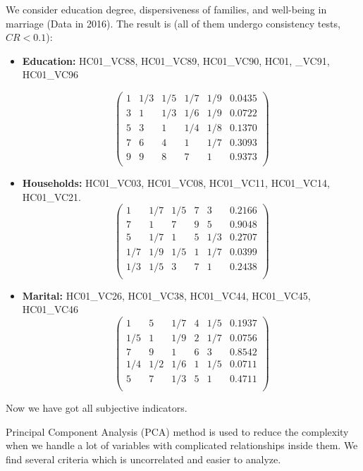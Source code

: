\documentclass{mcmthesis}
\begin{document}
We consider education degree, dispersiveness of families, and well-being in marriage (Data in 2016). The result is (all of them undergo consistency tests, $CR<0.1$):
\begin{itemize}
	\item \textbf{Education:} HC01\_VC88, HC01\_VC89, HC01\_VC90, HC01, \_VC91, HC01\_VC96
	
		$$ \left(
\begin{array}{ccccc|c}
1 & 1/3 & 1/5 & 1/7 & 1/9 & 0.0435\\
3 & 1 & 1/3 & 1/6 & 1/9 & 0.0722\\
5 & 3 & 1 & 1/4 & 1/8 & 0.1370\\
7 & 6 & 4 & 1 & 1/7 & 0.3093\\
9 & 9 & 8 & 7 & 1 & 0.9373\\
\end{array} \right) $$

	\item \textbf{Households:} HC01\_VC03, HC01\_VC08, HC01\_VC11, HC01\_VC14, HC01\_VC21.	
	$$ \left(
\begin{array}{ccccc|c}
1 & 1/7 & 1/5 & 7 & 3 & 0.2166\\
7 & 1 & 7 & 9 & 5 & 0.9048\\
5 & 1/7 & 1 & 5 & 1/3 & 0.2707\\
1/7 & 1/9 & 1/5 & 1 & 1/7 & 0.0399\\
1/3 & 1/5 & 3 & 7 & 1 & 0.2438\\
\end{array} \right) $$

	\item \textbf{Marital:} HC01\_VC26, HC01\_VC38, HC01\_VC44, HC01\_VC45, HC01\_VC46
	$$ \left(
\begin{array}{ccccc|c}
1 & 5 & 1/7 & 4 & 1/5 & 0.1937\\
1/5 & 1 & 1/9 & 2 & 1/7 & 0.0756\\
7 & 9 & 1 & 6 & 3 & 0.8542\\
1/4 & 1/2 & 1/6 & 1 & 1/5 & 0.0711\\
5 & 7 & 1/3 & 5 & 1 & 0.4711\\
\end{array} \right) $$
\end{itemize}
Now we have got all subjective indicators.

Principal Component Analysis (PCA) method is used to reduce the complexity when we handle a lot of variables with complicated relationships inside them. We find several criteria which is uncorrelated and easier to analyze.
\end{document}
